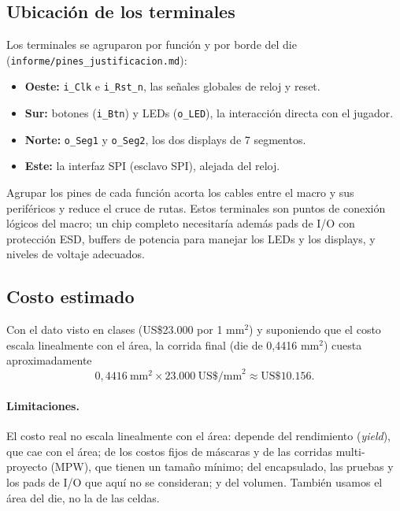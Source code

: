 \documentclass[11pt,letterpaper]{article}
\newcommand{\code}[1]{\texttt{#1}}
\begin{document}
\subsection{Ubicación de los terminales}

Los terminales se agruparon por función y por borde del die (\code{informe/pines\_justificacion.md}):
\begin{itemize}
  \item \textbf{Oeste:} \code{i\_Clk} e \code{i\_Rst\_n}, las señales globales de reloj y reset.
  \item \textbf{Sur:} botones (\code{i\_Btn}) y LEDs (\code{o\_LED}), la interacción directa con el jugador.
  \item \textbf{Norte:} \code{o\_Seg1} y \code{o\_Seg2}, los dos displays de 7 segmentos.
  \item \textbf{Este:} la interfaz SPI (esclavo SPI), alejada del reloj.
\end{itemize}
Agrupar los pines de cada función acorta los cables entre el macro y sus periféricos y reduce el cruce de rutas. Estos terminales son puntos de conexión lógicos del macro; un chip completo necesitaría además pads de I/O con protección ESD, buffers de potencia para manejar los LEDs y los displays, y niveles de voltaje adecuados.

\subsection{Costo estimado}

Con el dato visto en clases (US\$23.000 por 1 mm$^2$) y suponiendo que el costo escala linealmente con el área, la corrida final (die de 0,4416 mm$^2$) cuesta aproximadamente
\begin{equation}
0{,}4416\ \text{mm}^2 \times 23.000\ \text{US\$/mm}^2 \approx \text{US\$}10.156.
\end{equation}

\paragraph{Limitaciones.} El costo real no escala linealmente con el área: depende del rendimiento (\textit{yield}), que cae con el área; de los costos fijos de máscaras y de las corridas multi-proyecto (MPW), que tienen un tamaño mínimo; del encapsulado, las pruebas y los pads de I/O que aquí no se consideran; y del volumen. También usamos el área del die, no la de las celdas.
\end{document}
